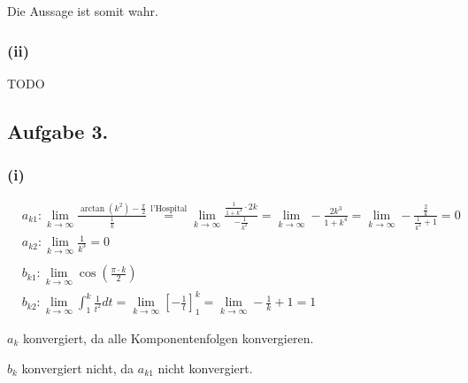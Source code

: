 \documentclass[10pt,a4paper]{scrartcl}
\begin{document}
Die Aussage ist somit wahr.
\subsubsection*{\textbf{(ii)}}

TODO
\subsection*{Aufgabe 3.}
\subsubsection*{\textbf{(i)}}
\begin{align*}
&a_{k1}: \lim_{k \to \infty} \frac{ \arctan \left( k^2 \right) - \frac{\pi}2}{\frac 1k} \overset{\text{l'Hospital}}{=} \lim_{k \to \infty} \frac{\frac{1}{1+ k^4} \cdot 2k}{- \frac{1}{k^2}} = \lim_{k \to \infty} - \frac{2k^3}{1+k^4} = \lim_{k \to \infty} - \frac{\frac 2k}{\frac 1{k^4} + 1} = 0\\
&a_{k2}: \lim_{k \to \infty} \frac 1{k^3} = 0\\
\\
&b_{k1}: \lim_{k \to \infty} \cos \left( \frac{\pi \cdot k}{2} \right)\\
&b_{k2}: \lim_{k \to \infty} \int_1^k \frac 1{t^2} dt = \lim_{k \to \infty} \left[ - \frac 1t \right]_1^k = \lim_{k \to \infty} -\frac 1k + 1 = 1 
\end{align*}

$a_k$ konvergiert, da alle Komponentenfolgen konvergieren.

$b_k$ konvergiert nicht, da $a_{k1}$ nicht konvergiert.
\end{document}
